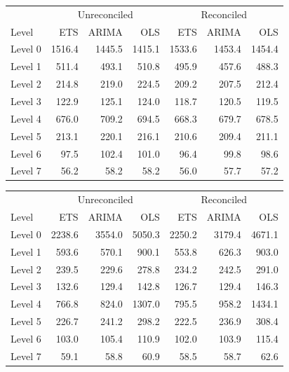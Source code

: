 \documentclass[11pt,a4paper,]{article}
\let\origtable\table
\let\endorigtable\endtable
\renewenvironment{table}[1][2] {
    \expandafter\origtable\expandafter[htbp]
} {
    \endorigtable
}
\begin{document}
\begin{table}[t]

\caption{\label{tab:Tourismdataresulrolling}Mean(RMSE) for ETS, ARIMA and OLS with and without reconciliation - 1-step-ahead - Tourism dataset}
\centering
\begin{tabular}{lrrrrrr}
\toprule
\multicolumn{1}{c}{} & \multicolumn{3}{c}{Unreconciled} & \multicolumn{3}{c}{Reconciled} \\
\cmidrule(l{3pt}r{3pt}){2-4} \cmidrule(l{3pt}r{3pt}){5-7}
Level & ETS & ARIMA & OLS & ETS & ARIMA & OLS\\
\midrule
Level 0 & 1516.4 & 1445.5 & 1415.1 & 1533.6 & 1453.4 & 1454.4\\
Level 1 & 511.4 & 493.1 & 510.8 & 495.9 & 457.6 & 488.3\\
Level 2 & 214.8 & 219.0 & 224.5 & 209.2 & 207.5 & 212.4\\
Level 3 & 122.9 & 125.1 & 124.0 & 118.7 & 120.5 & 119.5\\
Level 4 & 676.0 & 709.2 & 694.5 & 668.3 & 679.7 & 678.5\\
Level 5 & 213.1 & 220.1 & 216.1 & 210.6 & 209.4 & 211.1\\
Level 6 & 97.5 & 102.4 & 101.0 & 96.4 & 99.8 & 98.6\\
Level 7 & 56.2 & 58.2 & 58.2 & 56.0 & 57.7 & 57.2\\
\bottomrule
\end{tabular}
\end{table}

\begin{table}[t]

\caption{\label{tab:TourismdataresultRMSE}Mean(RMSE) for ETS, ARIMA and OLS with and without reconciliation - 24-step-ahead - Tourism dataset}
\centering
\begin{tabular}{lrrrrrr}
\toprule
\multicolumn{1}{c}{} & \multicolumn{3}{c}{Unreconciled} & \multicolumn{3}{c}{Reconciled} \\
\cmidrule(l{3pt}r{3pt}){2-4} \cmidrule(l{3pt}r{3pt}){5-7}
Level & ETS & ARIMA & OLS & ETS & ARIMA & OLS\\
\midrule
Level 0 & 2238.6 & 3554.0 & 5050.3 & 2250.2 & 3179.4 & 4671.1\\
Level 1 & 593.6 & 570.1 & 900.1 & 553.8 & 626.3 & 903.0\\
Level 2 & 239.5 & 229.6 & 278.8 & 234.2 & 242.5 & 291.0\\
Level 3 & 132.6 & 129.4 & 142.8 & 126.7 & 129.4 & 146.3\\
Level 4 & 766.8 & 824.0 & 1307.0 & 795.5 & 958.2 & 1434.1\\
Level 5 & 226.7 & 241.2 & 298.2 & 222.5 & 236.9 & 308.4\\
Level 6 & 103.0 & 105.4 & 110.9 & 102.0 & 103.9 & 115.4\\
Level 7 & 59.1 & 58.8 & 60.9 & 58.5 & 58.7 & 62.6\\
\bottomrule
\end{tabular}
\end{table}
\end{document}
